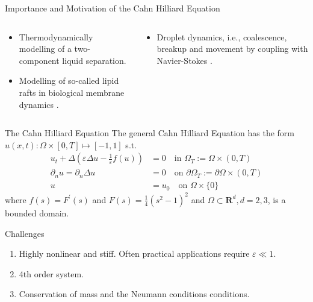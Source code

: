 \begin{frame}{Importance and Motivation of the Cahn Hilliard Equation}
    \begin{columns}
        \begin{column}{0.5\textwidth}
            \begin{itemize}
                \item Thermodynamically modelling of a two-component liquid separation\footnotemark[1].
            \item Modelling of so-called lipid rafts in biological membrane dynamics \footnotemark[2].
            \end{itemize}
        \end{column}
        \begin{column}{0.5\textwidth}
            \begin{itemize}
                \item Droplet dynamics, i.e., coalescence, breakup and movement by coupling with Navier-Stokes \footnotemark[3].
            \end{itemize}
        \end{column}
    \end{columns}
\end{frame}

\begin{frame}
    \begin{block}{The Cahn Hilliard Equation}
        The general Cahn Hilliard Equation  has the form $u( x, t): \Omega \times [0,T] \mapsto [-1,1]   $ s.t.
            \[
            \begin{split}
                 u_t+\Delta\left(\varepsilon \Delta u-\frac{1}{\varepsilon} f(u)\right)&=0 \quad \text{in } \Omega_T:=\Omega \times(0, T) \\
\partial_n u=\partial_n \Delta u& =0 \quad \text{on } \partial \Omega_T:=\partial \Omega \times(0, T) \\
 u & =u_0 \quad \text{on } \Omega \times\{0\}
            \end{split}
            \]
where $f(s)=F^{\prime}(s)$ and $F(s)=\frac{1}{4}\left(s^2-1\right)^2$ and $\Omega \subset \mathbf{R}^d, d=2,3$, is a bounded domain.
\end{block}

\begin{block}{Challenges}
    \begin{enumerate}
        \item Highly nonlinear and stiff. Often practical applications require $\varepsilon \ll 1$.
        \item 4th order system.
        \item Conservation of mass and the Neumann conditions conditions.
    \end{enumerate}
\end{block}

\end{frame}

